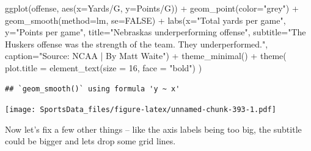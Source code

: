\documentclass[
]{book}
\newenvironment{Shaded}{\begin{snugshade}}{\end{snugshade}}
\newcommand{\AttributeTok}[1]{\textcolor[rgb]{0.77,0.63,0.00}{#1}}
\newcommand{\ConstantTok}[1]{\textcolor[rgb]{0.00,0.00,0.00}{#1}}
\newcommand{\DecValTok}[1]{\textcolor[rgb]{0.00,0.00,0.81}{#1}}
\newcommand{\FunctionTok}[1]{\textcolor[rgb]{0.00,0.00,0.00}{#1}}
\newcommand{\NormalTok}[1]{#1}
\newcommand{\SpecialCharTok}[1]{\textcolor[rgb]{0.00,0.00,0.00}{#1}}
\newcommand{\StringTok}[1]{\textcolor[rgb]{0.31,0.60,0.02}{#1}}
\begin{document}
\begin{Shaded}
\begin{Highlighting}[]
\FunctionTok{ggplot}\NormalTok{(offense, }\FunctionTok{aes}\NormalTok{(}\AttributeTok{x=}\StringTok{\textasciigrave{}}\AttributeTok{Yards/G}\StringTok{\textasciigrave{}}\NormalTok{, }\AttributeTok{y=}\StringTok{\textasciigrave{}}\AttributeTok{Points/G}\StringTok{\textasciigrave{}}\NormalTok{)) }\SpecialCharTok{+} 
  \FunctionTok{geom\_point}\NormalTok{(}\AttributeTok{color=}\StringTok{"grey"}\NormalTok{) }\SpecialCharTok{+} \FunctionTok{geom\_smooth}\NormalTok{(}\AttributeTok{method=}\NormalTok{lm, }\AttributeTok{se=}\ConstantTok{FALSE}\NormalTok{) }\SpecialCharTok{+} 
  \FunctionTok{labs}\NormalTok{(}\AttributeTok{x=}\StringTok{"Total yards per game"}\NormalTok{, }\AttributeTok{y=}\StringTok{"Points per game"}\NormalTok{, }\AttributeTok{title=}\StringTok{"Nebraska\textquotesingle{}s underperforming offense"}\NormalTok{, }\AttributeTok{subtitle=}\StringTok{"The Husker\textquotesingle{}s offense was the strength of the team. They underperformed."}\NormalTok{, }\AttributeTok{caption=}\StringTok{"Source: NCAA | By Matt Waite"}\NormalTok{) }\SpecialCharTok{+} 
  \FunctionTok{theme\_minimal}\NormalTok{() }\SpecialCharTok{+} 
  \FunctionTok{theme}\NormalTok{(}
    \AttributeTok{plot.title =} \FunctionTok{element\_text}\NormalTok{(}\AttributeTok{size =} \DecValTok{16}\NormalTok{, }\AttributeTok{face =} \StringTok{"bold"}\NormalTok{)}
\NormalTok{    ) }
\end{Highlighting}
\end{Shaded}

\begin{verbatim}
## `geom_smooth()` using formula 'y ~ x'
\end{verbatim}

\texttt{[image: SportsData\_files/figure-latex/unnamed-chunk-393-1.pdf]}

Now let's fix a few other things -- like the axis labels being too big, the subtitle could be bigger and lets drop some grid lines.
\end{document}
